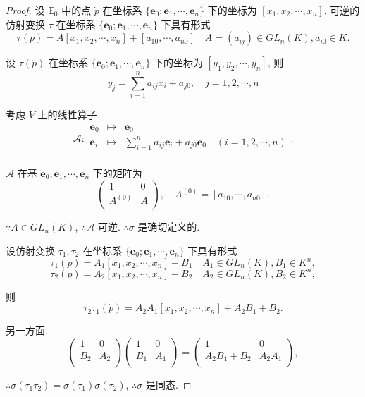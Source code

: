 \documentclass[color=black,device=normal,lang=cn,mode=geye]{elegantnote}
\begin{document}
\begin{proof}
    设 $\mathbb{E}_0$ 中的点 $\dot{p}$ 在坐标系 $\{\boldsymbol{e}_0;\boldsymbol{e}_1,\cdots,\boldsymbol{e}_n\}$ 下的坐标为 $[x_1,x_2,\cdots,x_n]$, 可逆的仿射变换 $\tau$ 在坐标系 $\{\boldsymbol{e}_0;\boldsymbol{e}_1,\cdots,\boldsymbol{e}_n\}$ 下具有形式
    \[\tau(\dot{p})=A[x_1,x_2,\cdots,x_n]+[a_{10},\cdots,a_{n0}]\quad A=(a_{ij})\in GL _n(K),a_{i0}\in K.\]

    设 $\tau(\dot{p})$ 在坐标系 $\{\boldsymbol{e}_0;\boldsymbol{e}_1,\cdots,\boldsymbol{e}_n\}$ 下的坐标为 $[y_1,y_2,\cdots,y_n]$, 则
    \[y_j=\sum\limits_{i=1}^na_{ij}x_i+a_{j0},\quad j=1,2,\cdots,n\]

    考虑 $V$ 上的线性算子
    \[\mathcal{A}:\begin{array}{rcl}
        \boldsymbol{e}_0 & \mapsto & \boldsymbol{e}_0 \\
        \boldsymbol{e}_i & \mapsto & \sum\limits_{i=1}^na_{ij}\boldsymbol{e}_i+a_{j0}\boldsymbol{e}_0\quad(i=1,2,\cdots,n) \\
    \end{array}.\]

    $\mathcal{A}$ 在基 $\boldsymbol{e}_0,\boldsymbol{e}_1,\cdots,\boldsymbol{e}_n$ 下的矩阵为
    \[\begin{pmatrix}
        1 & 0 \\
        A^{(0)} & A \\
    \end{pmatrix},\quad A^{(0)}=[a_{10},\cdots,a_{n0}].\]

    $\because A\in GL _n(K)$, $\therefore\mathcal{A}$ 可逆. $\therefore\sigma$ 是确切定义的.

    设仿射变换 $\tau_1,\tau_2$ 在坐标系 $\{\boldsymbol{e}_0;\boldsymbol{e}_1,\cdots,\boldsymbol{e}_n\}$ 下具有形式
    \[\tau_1(\dot{p})=A_1[x_1,x_2,\cdots,x_n]+B_1\quad A_1\in GL _n(K),B_1\in K^n,\]
    \[\tau_2(\dot{p})=A_2[x_1,x_2,\cdots,x_n]+B_2\quad A_2\in GL _n(K),B_2\in K^n,\]

    则
    \[\tau_2\tau_1(\dot{p})=A_2A_1[x_1,x_2,\cdots,x_n]+A_2B_1+B_2.\]

    另一方面,
    \[\begin{pmatrix}
        1 & 0 \\
        B_2 & A_2 \\
    \end{pmatrix}\begin{pmatrix}
        1 & 0 \\
        B_1 & A_1 \\
    \end{pmatrix}=\begin{pmatrix}
        1 & 0 \\
        A_2B_1+B_2 & A_2A_1 \\
    \end{pmatrix},\]

    $\therefore\sigma(\tau_1\tau_2)=\sigma(\tau_1)\sigma(\tau_2)$, $\therefore\sigma$ 是同态.
\end{proof}
\end{document}

